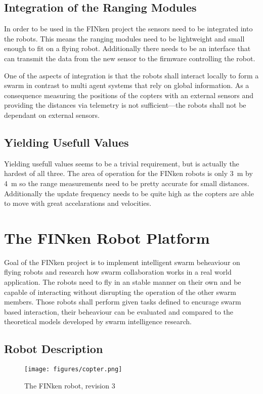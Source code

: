 \subsection{Integration of the Ranging Modules}
\label{req2}
In order to be used in the FINken project the sensors need to be integrated into the robots.
This means the ranging modules need to be lightweight and small enough to fit on a flying robot.
Additionally there needs to be an interface that can transmit the data from the new sensor to the firmware controlling the robot.

One of the aspects of integration is that the robots shall interact locally to form a swarm in contrast to multi agent systems that rely on global information.
As a consequence measuring the positions of the copters with an external sensors and providing the distances via telemetry is not sufficient—the robots shall not be dependant on external sensors.

\subsection{Yielding Usefull Values}
\label{req3}
Yielding usefull values seems to be a trivial requirement, but is actually the hardest of all three.
The area of operation for the FINken robots is only \SI{3}{m} by \SI{4}{m} so the range measurements need to be pretty accurate for small distances. 
Additionally the update frequency needs to be quite high as the copters are able to move with great accelarations and velocities.

\section{The FINken Robot Platform}


Goal of the FINken project is to implement intelligent swarm beheaviour on flying robots and research how swarm collaboration works in a real world application.
The robots need to fly in an stable manner on their own and be capable of interacting without disrupting the operation of the other swarm members.
Those robots shall perform given tasks defined to encurage swarm based interaction, their beheaviour can be evaluated and compared to the theoretical models developed by swarm intelligence research.

\subsection{Robot Description}
\begin{figure}[H]
	\centering
\texttt{[image: figures/copter.png]}
\label{copterfoto}
\caption{The FINken robot, revision 3}
\end{figure}

